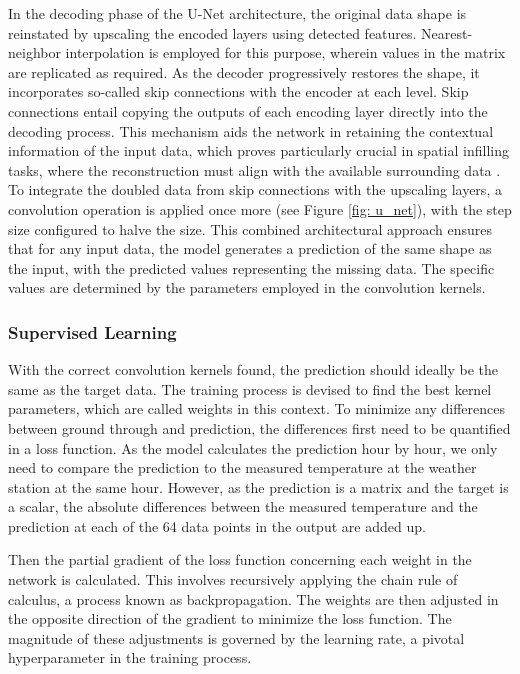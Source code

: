 In the decoding phase of the U-Net architecture, the original data shape is reinstated by upscaling the encoded layers using detected features. Nearest-neighbor interpolation is employed for this purpose, wherein values in the matrix are replicated as required.
As the decoder progressively restores the shape, it incorporates so-called skip connections with the encoder at each level. Skip connections entail copying the outputs of each encoding layer directly into the decoding process.
This mechanism aids the network in retaining the contextual information of the input data, which proves particularly crucial in spatial infilling tasks, where the reconstruction must align with the available surrounding data \cite{liu2018inpaining}.
To integrate the doubled data from skip connections with the upscaling layers, a convolution operation is applied once more (see Figure \ref{fig: u_net}), with the step size configured to halve the size.
This combined architectural approach ensures that for any input data, the model generates a prediction of the same shape as the input, with the predicted values representing the missing data.
The specific values are determined by the parameters employed in the convolution kernels.

\subsubsection*{Supervised Learning}

With the correct convolution kernels found, the prediction should ideally be the same as the target data.
The training process is devised to find the best kernel parameters, which are called weights in this context.
To minimize any differences between ground through and prediction, the differences first need to be quantified in a loss function.
As the model calculates the prediction hour by hour, we only need to compare the prediction to the measured temperature at the weather station at the same hour.
However, as the prediction is a matrix and the target is a scalar, the absolute differences between the measured temperature and the prediction at each of the 64 data points in the output are added up. 

Then the partial gradient of the loss function concerning each weight in the network is calculated.
This involves recursively applying the chain rule of calculus, a process known as backpropagation. The weights are then adjusted in the opposite direction of the gradient to minimize the loss function.
The magnitude of these adjustments is governed by the learning rate, a pivotal hyperparameter in the training process. 

